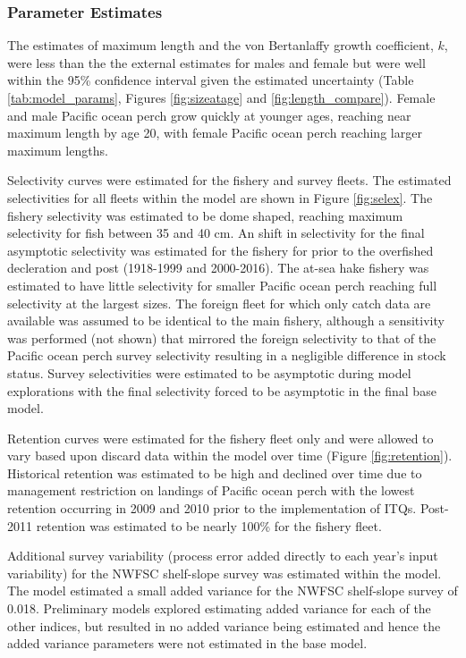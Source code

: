 \documentclass[12pt,]{article}
\begin{document}
\subsubsection{Parameter Estimates}\label{parameter-estimates}

The estimates of maximum length and the von Bertanlaffy growth
coefficient, \(k\), were less than the the external estimates for males
and female but were well within the 95\% confidence interval given the
estimated uncertainty (Table \ref{tab:model_params}, Figures
\ref{fig:sizeatage} and \ref{fig:length_compare}). Female and male
Pacific ocean perch grow quickly at younger ages, reaching near maximum
length by age 20, with female Pacific ocean perch reaching larger
maximum lengths.

Selectivity curves were estimated for the fishery and survey fleets. The
estimated selectivities for all fleets within the model are shown in
Figure \ref{fig:selex}. The fishery selectivity was estimated to be dome
shaped, reaching maximum selectivity for fish between 35 and 40 cm. An
shift in selectivity for the final asymptotic selectivity was estimated
for the fishery for prior to the overfished decleration and post
(1918-1999 and 2000-2016). The at-sea hake fishery was estimated to have
little selectivity for smaller Pacific ocean perch reaching full
selectivity at the largest sizes. The foreign fleet for which only catch
data are available was assumed to be identical to the main fishery,
although a sensitivity was performed (not shown) that mirrored the
foreign selectivity to that of the Pacific ocean perch survey
selectivity resulting in a negligible difference in stock status. Survey
selectivities were estimated to be asymptotic during model explorations
with the final selectivity forced to be asymptotic in the final base
model.

Retention curves were estimated for the fishery fleet only and were
allowed to vary based upon discard data within the model over time
(Figure \ref{fig:retention}). Historical retention was estimated to be
high and declined over time due to management restriction on landings of
Pacific ocean perch with the lowest retention occurring in 2009 and 2010
prior to the implementation of ITQs. Post-2011 retention was estimated
to be nearly 100\% for the fishery fleet.

Additional survey variability (process error added directly to each
year's input variability) for the NWFSC shelf-slope survey was estimated
within the model. The model estimated a small added variance for the
NWFSC shelf-slope survey of 0.018. Preliminary models explored
estimating added variance for each of the other indices, but resulted in
no added variance being estimated and hence the added variance
parameters were not estimated in the base model.
\end{document}
